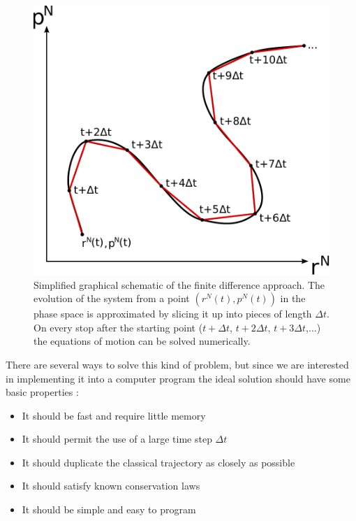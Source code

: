 \documentclass[12pt]{article}
\begin{document}
\begin{figure}
    \begin{center}
        \includegraphics[scale=0.5]{images/finite_approach.pdf}
        \caption{Simplified graphical schematic of the finite difference approach. The evolution of the system from a point $(r^N(t),p^N(t))$ in the
            phase space is approximated by slicing it up into pieces of length $\Delta t$. On every stop after the starting point ($t+\Delta t$, 
            $t+2\Delta t$, $t+3\Delta t$,$\ldots$) the equations of motion can be solved numerically.}
        \label{fig:finitedifference} 
    \end{center}
\end{figure}
There are several ways to solve this kind of problem, but since we are interested in implementing it into a computer program the ideal solution
should have some basic properties \cite{Allen1989}:
\begin{itemize}
    \item It should be fast and require little memory
    \item It should permit the use of a large time step $\Delta t$
    \item It should duplicate the classical trajectory as closely as possible
    \item It should satisfy known conservation laws
    \item It should be simple and easy to program
\end{itemize}
\end{document}
